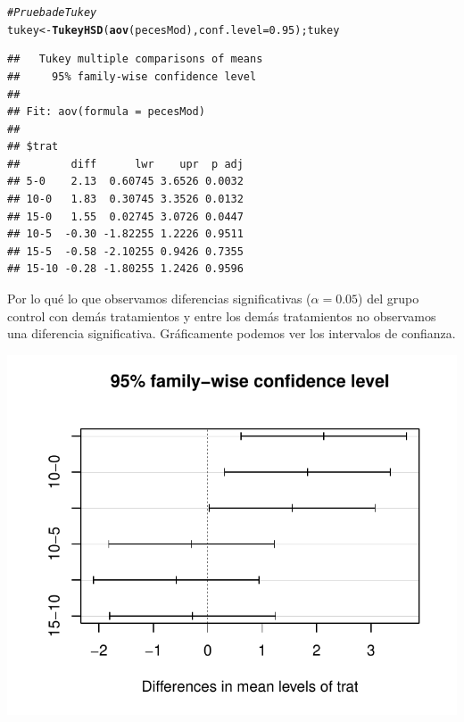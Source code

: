 \documentclass[a4paper]{scrartcl}\usepackage[]{graphicx}\usepackage[]{color}
\makeatletter
\def\maxwidth{ %
  \ifdim\Gin@nat@width>\linewidth
    \linewidth
  \else
    \Gin@nat@width
  \fi
}
\newcommand{\hlnum}[1]{\textcolor[rgb]{0.686,0.059,0.569}{#1}}%
\newcommand{\hlcom}[1]{\textcolor[rgb]{0.678,0.584,0.686}{\textit{#1}}}%
\newcommand{\hlstd}[1]{\textcolor[rgb]{0.345,0.345,0.345}{#1}}%
\newcommand{\hlkwb}[1]{\textcolor[rgb]{0.69,0.353,0.396}{#1}}%
\newcommand{\hlkwc}[1]{\textcolor[rgb]{0.333,0.667,0.333}{#1}}%
\newcommand{\hlkwd}[1]{\textcolor[rgb]{0.737,0.353,0.396}{\textbf{#1}}}%
\newenvironment{kframe}{%
 \def\at@end@of@kframe{}%
 \ifinner\ifhmode%
  \def\at@end@of@kframe{\end{minipage}}%
  \begin{minipage}{\columnwidth}%
 \fi\fi%
 \def\FrameCommand##1{\hskip\@totalleftmargin \hskip-\fboxsep
 \colorbox{shadecolor}{##1}\hskip-\fboxsep
     \hskip-\linewidth \hskip-\@totalleftmargin \hskip\columnwidth}%
 \MakeFramed {\advance\hsize-\width
   \@totalleftmargin\z@ \linewidth\hsize
   \@setminipage}}%
 {\par\unskip\endMakeFramed%
 \at@end@of@kframe}
\newenvironment{knitrout}{}{} %
\makeatother
\begin{document}
\begin{knitrout}
\color{fgcolor}\begin{kframe}
\begin{alltt}
\hlcom{# Prueba de Tukey}
\hlstd{tukey} \hlkwb{<-} \hlkwd{TukeyHSD}\hlstd{(}\hlkwd{aov}\hlstd{(pecesMod),} \hlkwc{conf.level} \hlstd{=} \hlnum{0.95}\hlstd{); tukey}
\end{alltt}
\begin{verbatim}
##   Tukey multiple comparisons of means
##     95% family-wise confidence level
## 
## Fit: aov(formula = pecesMod)
## 
## $trat
##        diff      lwr    upr  p adj
## 5-0    2.13  0.60745 3.6526 0.0032
## 10-0   1.83  0.30745 3.3526 0.0132
## 15-0   1.55  0.02745 3.0726 0.0447
## 10-5  -0.30 -1.82255 1.2226 0.9511
## 15-5  -0.58 -2.10255 0.9426 0.7355
## 15-10 -0.28 -1.80255 1.2426 0.9596
\end{verbatim}
\end{kframe}
\end{knitrout}

\noindent Por lo qué lo que observamos diferencias significativas ($\alpha = 0.05$) del grupo control con demás tratamientos y entre los demás tratamientos no observamos una diferencia significativa. Gráficamente podemos ver los intervalos de confianza.

\begin{knitrout}
\color{fgcolor}

{\centering \includegraphics[width=\maxwidth]{figure/unnamed-chunk-16} 

}



\end{knitrout}
\end{document}
